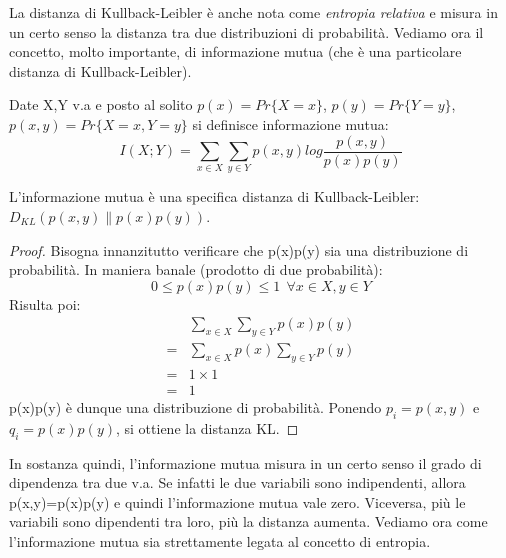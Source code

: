 La distanza di Kullback-Leibler è anche nota come \textit{entropia relativa} e misura in un certo senso la distanza tra due distribuzioni di probabilità. Vediamo ora il concetto, molto importante, di informazione mutua (che è una particolare distanza di Kullback-Leibler).

\begin{definizione}
 Date X,Y v.a e posto al solito $p(x)=Pr\{X=x\}$, $p(y)=Pr\{Y=y\}$, $p(x,y)=Pr\{X=x, Y=y\}$ si definisce 
 informazione mutua:
 \[
  I(X;Y)=\sum_{x \in X} \sum_{y \in Y} p(x,y) log \frac{p(x,y)}{p(x)p(y)}
 \]
\end{definizione}

\begin{osservazione}
 L'informazione mutua è una specifica distanza di Kullback-Leibler: $D_{KL}(p(x,y) \|  p(x)p(y))$.
 \begin{proof}
  Bisogna innanzitutto verificare che p(x)p(y) sia una distribuzione di probabilità.
  In maniera banale (prodotto di due probabilità):
  \[
   0 \le p(x)p(y) \le 1 \ \ \forall x \in X,y \in Y
  \]
  Risulta poi:
  \[\begin{split}
   &\sum_{x \in X}\sum_{y \in Y} p(x)p(y) \\
   =&\sum_{x \in X} p(x) \sum_{y \in Y}p(y) \\
   =& 1 \times 1 \\
   =&1 
    \end{split}
  \]
  p(x)p(y) è dunque una distribuzione di probabilità.
  Ponendo $p_i=p(x,y)$ e $q_i=p(x)p(y)$, si ottiene la distanza KL.
 \end{proof}

\end{osservazione}

In sostanza quindi, l'informazione mutua misura in un certo senso il grado di dipendenza tra due v.a.
Se infatti le due variabili sono indipendenti, allora p(x,y)=p(x)p(y) e quindi l'informazione mutua vale zero. Viceversa, più le 
variabili sono dipendenti tra loro, più la distanza aumenta. Vediamo ora come l'informazione mutua sia strettamente legata 
al concetto di entropia.

